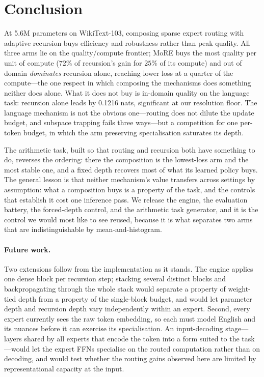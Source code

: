 \section{Conclusion}
\label{sec:conclusion}

At 5.6M parameters on WikiText-103, composing sparse expert routing with
adaptive recursion buys efficiency and robustness rather than peak quality. All
three arms lie on the quality/compute frontier; MoRE buys the most quality per
unit of compute ($72\%$ of recursion's gain for $25\%$ of its compute) and out of
domain \emph{dominates} recursion alone, reaching lower loss at a quarter of the
compute---the one respect in which composing the mechanisms does something
neither does alone. What it does not buy is in-domain quality on the language
task: recursion alone leads by 0.1216 nats, significant at our resolution floor.
The language mechanism is not the obvious one---routing does not dilute the
update budget, and subspace trapping fails three ways---but a competition for one
per-token budget, in which the arm preserving specialisation saturates its depth.

The arithmetic task, built so that routing and recursion both have something to
do, reverses the ordering: there the composition is the lowest-loss arm and the
most stable one, and a fixed depth recovers most of what its learned policy buys.
The general lesson is that neither mechanism's value transfers across settings by
assumption: what a composition buys is a property of the task, and the controls
that establish it cost one inference pass. We release the engine, the evaluation
battery, the forced-depth control, and the arithmetic task generator, and it is
the control we would most like to see reused, because it is what separates two
arms that are indistinguishable by mean-and-histogram.

\paragraph{Future work.} Two extensions follow from the implementation as it
stands. The engine applies one dense block per recursion step; stacking several
distinct blocks and backpropagating through the whole stack would separate a
property of weight-tied depth from a property of the single-block budget, and
would let parameter depth and recursion depth vary independently within an
expert. Second, every expert currently sees the raw token embedding, so each must
model English and its nuances before it can exercise its specialisation. An
input-decoding stage---layers shared by all experts that encode the token into a
form suited to the task---would let the expert FFNs specialise on the
routed computation rather than on decoding, and would test whether the routing
gains observed here are limited by representational capacity at the input.
